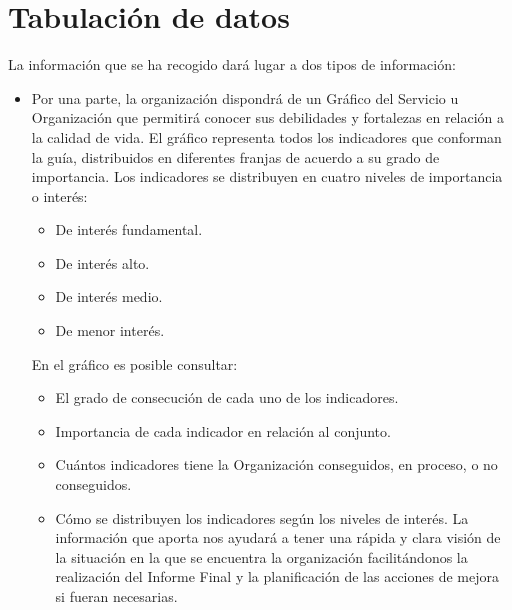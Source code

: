 \section{Tabulación de datos}
La información que se ha recogido dará lugar a dos tipos de información:
\begin{itemize}
	\item Por una parte, la organización dispondrá de un Gráfico del Servicio u
	Organización que permitirá conocer sus debilidades y fortalezas en
	relación a la calidad de vida. El gráfico representa todos los indicadores que conforman la guía, distribuidos
	en diferentes franjas de acuerdo a su grado de importancia.
	Los indicadores se distribuyen en cuatro niveles de importancia o interés:
	\begin{itemize}
		\item De interés fundamental.
		\item De interés alto.
		\item De interés medio.
		\item De menor interés.
	\end{itemize}
	En el gráfico es posible consultar:
	\begin{itemize}
		\item El grado de consecución de cada uno de los indicadores.
		\item Importancia de cada indicador en relación al conjunto.
		\item Cuántos indicadores tiene la Organización conseguidos, en proceso, o
		no conseguidos.
		\item Cómo se distribuyen los indicadores según los niveles de interés.
		La información que aporta nos ayudará a tener una rápida y clara visión de la
		situación en la que se encuentra la organización facilitándonos la realización
		del Informe Final y la planificación de las acciones de mejora si fueran
		necesarias.
	\end{itemize}


\end{itemize}
